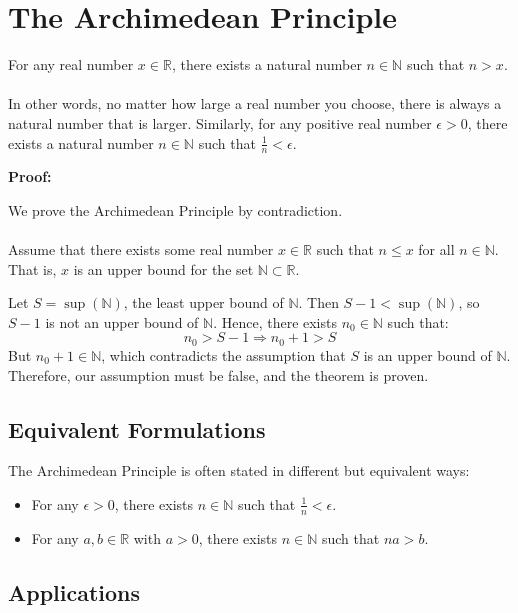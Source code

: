 \newpage
\section{The Archimedean Principle}

For any real number \( x \in \mathbb{R} \), there exists a natural number \( n \in \mathbb{N} \) such that \( n > x \).
\\\\
In other words, no matter how large a real number you choose, there is always a natural number that is larger. Similarly, for any positive real number \( \epsilon > 0 \), there exists a natural number \( n \in \mathbb{N} \) such that \( \frac{1}{n} < \epsilon \).

\textbf{Proof:}

We prove the Archimedean Principle by contradiction.
\\\\
Assume that there exists some real number \( x \in \mathbb{R} \) such that \( n \leq x \) for all \( n \in \mathbb{N} \). That is, \( x \) is an upper bound for the set \( \mathbb{N} \subset \mathbb{R} \).

Let \( S = \sup(\mathbb{N}) \), the least upper bound of \( \mathbb{N} \). Then \( S - 1 < \sup(\mathbb{N}) \), so \( S - 1 \) is not an upper bound of \( \mathbb{N} \). Hence, there exists \( n_0 \in \mathbb{N} \) such that:
\[
	n_0 > S - 1 \Rightarrow n_0 + 1 > S
\]
But \( n_0 + 1 \in \mathbb{N} \), which contradicts the assumption that \( S \) is an upper bound of \( \mathbb{N} \). Therefore, our assumption must be false, and the theorem is proven.

\QED

\subsection{Equivalent Formulations}

The Archimedean Principle is often stated in different but equivalent ways:

\begin{itemize}[label=\(-\)]
	\item For any \( \epsilon > 0 \), there exists \( n \in \mathbb{N} \) such that \( \frac{1}{n} < \epsilon \).
	\item For any \( a, b \in \mathbb{R} \) with \( a > 0 \), there exists \( n \in \mathbb{N} \) such that \( na > b \).
\end{itemize}

\subsection{Applications}

